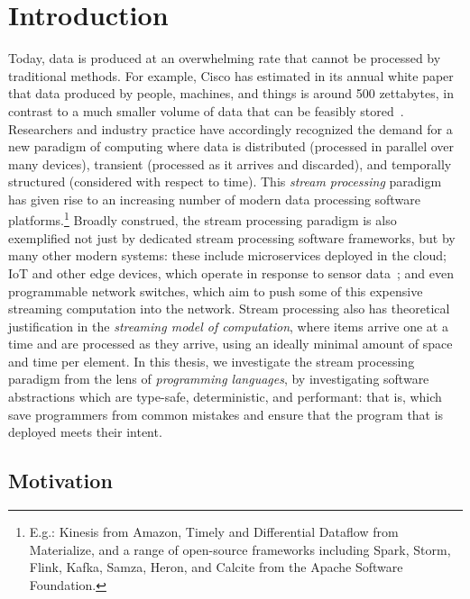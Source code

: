 \chapter{Introduction}
\label{cha:intro}

Today, data is produced at an overwhelming rate
that cannot be processed by traditional methods.
For example, Cisco has estimated in its annual white paper
that data produced by people, machines, and things
is around 500 zettabytes, in contrast to a much smaller volume
of data that can be feasibly stored~\cite{index2018forecast}.
Researchers and industry practice have accordingly recognized the demand
for a new paradigm of computing where data is
distributed (processed in parallel over many devices),
transient (processed as it arrives and discarded),
and temporally structured (considered with respect to time).
This \emph{stream processing} paradigm has given rise to an increasing number
of modern data processing software platforms.\footnote{E.g.: Kinesis from Amazon, Timely and Differential Dataflow from Materialize, and a range of open-source frameworks including Spark, Storm, Flink, Kafka, Samza, Heron, and Calcite from the Apache Software Foundation.}
Broadly construed, the stream processing paradigm is also exemplified not just by dedicated stream processing software frameworks, but by many other modern systems: these include microservices deployed in the cloud; IoT and other edge devices, which operate in response
to sensor data~\cite{shi2016edge, ashton2009internet}; and even programmable network switches,
which aim to push some of this expensive streaming computation
into the network.
Stream processing also has theoretical justification in the \emph{streaming model of computation},
where items arrive one at a time and are processed as they arrive, using
an ideally minimal amount of space and time per element.
In this thesis, we investigate the stream processing paradigm from the lens of \emph{programming languages}, by investigating software abstractions which are type-safe, deterministic, and performant: that is, which save programmers from common mistakes and ensure that the program that is deployed meets their intent.

\section{Motivation}

